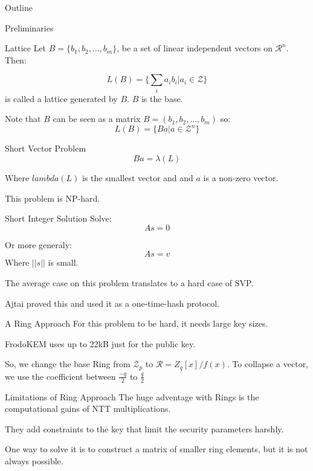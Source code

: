 \documentclass[presentation]{beamer}
\author{Sergi Simón Balcells}
\date{\today}
\title{}
\begin{document}
\begin{frame}{Outline}
  \tableofcontents
\end{frame}

\begin{frame}[label=preliminaries]{Preliminaries}
\end{frame}
\begin{frame}[label=lattice]{Lattice}
  Let \(B = \{b_1, b_2, \dots, b_m\}\), be a set of linear
  independent
  vectors on \(\mathcal R ^ n\). Then:

  \[
    L(B) = \{\sum_i a_i b_i | a_i \in \mathcal Z \}
  \]
  is called a lattice generated by \(B\). \(B\) is the base.

  Note that \(B\) can be seen as a matrix \(B = (b_1, b_2,
  \dots, b_m)\)
  so:
  \[
    L(B) = \{Ba | a \in \mathcal Z^{n} \}
  \]
\end{frame}
\begin{frame}[label=short-vector-problem]{Short Vector Problem}
  \[
    Ba = \lambda(L)
  \]

  Where \(lambda (L)\) is the smallest vector and and \(a\)
  is a non-zero
  vector.

  This problem is NP-hard.
\end{frame}
\begin{frame}[label=short-integer-solution]{Short Integer
  Solution}
  Solve:
  \[
    As = 0
  \]

  Or more generaly:
  \[
    As = v
  \]
  Where \(||s||\) is small.

  The average case on this problem translates to a hard case
  of SVP.

  Ajtai proved this and used it as a one-time-hash protocol.
\end{frame}
\begin{frame}[label=a-ring-approach]{A Ring Approach}
  For this problem to be hard, it needs large key sizes.

  FrodoKEM uses up to 22kB just for the public key.

  So, we change the base Ring from \(\mathcal Z_p\) to
  \(\mathcal R = Z_q[x] / f(x)\).
  \pause
  To collapse a vector, we use the coefficient between 
  $\frac{-q}{2}$ to $\frac{q}{2}$
\end{frame}
\begin{frame}[label=limitations-of-ring-approach]{Limitations
  of Ring Approach}
  The huge adventage with Rings is the computational gains of NTT
  multiplications.

  They add constraints to the key that limit the security
  parameters
  harshly.

  One way to solve it is to construct a matrix of smaller ring
  elements,
  but it is not always possible.
\end{frame}
\end{document}
